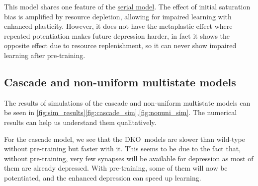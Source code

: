 \documentclass[10pt]{article}
\newcommand{\KO}{DKO}
\begin{document}
This model shares one feature of the \hyperref[sec:multistate]{serial model}.
The effect of initial saturation bias is amplified by resource depletion, allowing for impaired learning with enhanced plasticity.
However, it does not have the metaplastic effect where repeated potentiation makes future depression harder, in fact it shows the opposite effect due to resource replenishment, so it can never show impaired learning after pre-training.




\subsection{Cascade and non-uniform multistate models}\label{sec:cascade}

%



The results of simulations of the cascade and non-uniform multistate models can be seen in
\autoref{fig:sim_results}\ref{fig:cascade_sim},\ref{fig:nonuni_sim}. %
The numerical results can help us understand them qualitatively.

For the cascade model, we see that the \KO\ models are slower than wild-type without pre-training but faster with it.
This seems to be due to the fact that, without pre-training, very few synapses will be available for depression as most of them are already depressed.
With pre-training, some of them will now be potentiated,
and the enhanced depression can speed up learning.

%
\end{document}
